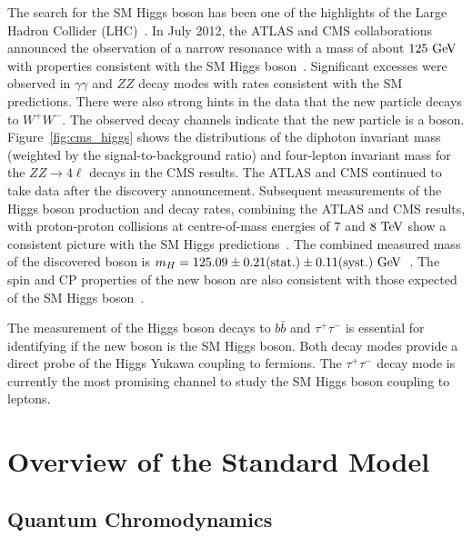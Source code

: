 The search for the SM Higgs boson has been one of the highlights of the Large Hadron Collider (LHC)~\cite{1748-0221-3-08-S08001}. In July 2012, the ATLAS and CMS collaborations announced the observation of a narrow resonance with a mass of about $125~\mathrm{Ge\kern -0.1em V}$ with properties consistent with the SM Higgs boson~\cite{Aad:2012tfa,Chatrchyan:2012xdj}. Significant excesses were observed in $\gamma\gamma$ and $ZZ$ decay modes with rates consistent with the SM predictions. There were also strong hints in the data that the new particle decays to $W^+W^-$. The observed decay channels indicate that the new particle is a boson. Figure~\ref{fig:cms_higgs} shows the distributions of the diphoton invariant mass (weighted by the signal-to-background ratio) and four-lepton invariant mass for the $ZZ \rightarrow 4\ell$ decays in the CMS results. The ATLAS and CMS continued to take data after the discovery announcement. Subsequent measurements of the Higgs boson production and decay rates, combining the ATLAS and CMS results, with proton-proton collisions at centre-of-mass energies of $7$ and $8~\mathrm{Te\kern -0.1em V}$ show a consistent picture with the SM Higgs predictions~\cite{Khachatryan:2016vau}. The combined measured mass of the discovered boson is $m_{H}=125.09 \pm 0.21 \mathrm{(stat.)} \pm 0.11 \mathrm{(syst.)}~\mathrm{Ge\kern -0.1em V}$~\cite{Aad:2015zhl}. The spin and CP properties of the new boson are also consistent with those expected of the SM Higgs boson~\cite{Chatrchyan:2012jja,Aad:2013xqa,Khachatryan:2014kca}.

The measurement of the Higgs boson decays to $b\bar{b}$ and $\tau^{+}\tau^{-}$ is essential for identifying if the new boson is the SM Higgs boson. Both decay modes provide a direct probe of the Higgs Yukawa coupling to fermions. The $\tau^{+}\tau^{-}$ decay mode is currently the most promising channel to study the SM Higgs boson coupling to leptons.

\section{Overview of the Standard Model}

\subsection{Quantum Chromodynamics}

